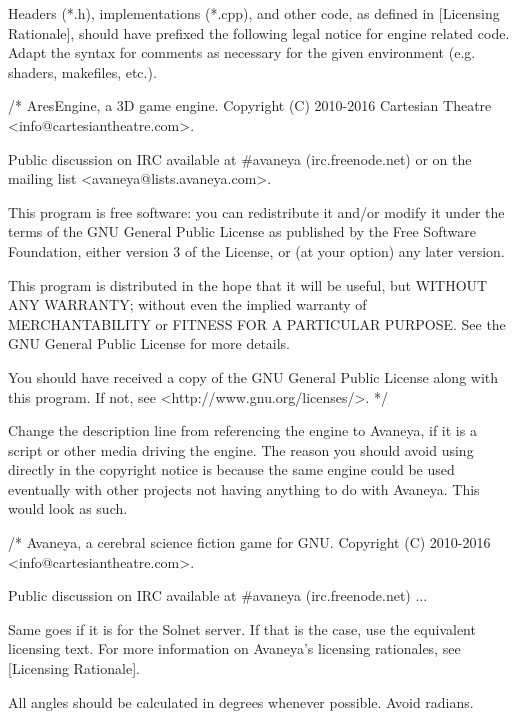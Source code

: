 Headers (*.h), implementations (*.cpp), and other code, as defined in [Licensing Rationale], should have prefixed the following legal notice for engine related code. Adapt the syntax for comments as necessary for the given environment (e.g. shaders, makefiles, etc.).

\startCodeExample
/*
    AresEngine, a 3D game engine.
    Copyright (C) 2010-2016 Cartesian Theatre <info@cartesiantheatre.com>.

    Public discussion on IRC available at #avaneya (irc.freenode.net)
    or on the mailing list <avaneya@lists.avaneya.com>.

    This program is free software: you can redistribute it and/or modify
    it under the terms of the GNU General Public License as published by
    the Free Software Foundation, either version 3 of the License, or
    (at your option) any later version.

    This program is distributed in the hope that it will be useful,
    but WITHOUT ANY WARRANTY; without even the implied warranty of
    MERCHANTABILITY or FITNESS FOR A PARTICULAR PURPOSE.  See the
    GNU General Public License for more details.

    You should have received a copy of the GNU General Public License
    along with this program.  If not, see <http://www.gnu.org/licenses/>.
*/
\stopCodeExample

Change the description line from referencing the engine to Avaneya, if it is a script or other media driving the engine. The reason you should avoid using  directly in the copyright notice is because the same engine could be used eventually with other projects not having anything to do with Avaneya. This would look as such.

\startCodeExample
/*
    Avaneya, a cerebral science fiction game for GNU.
    Copyright (C) 2010-2016 <info@cartesiantheatre.com>.

    Public discussion on IRC available at #avaneya (irc.freenode.net)
    ...
\stopCodeExample

Same goes if it is for the Solnet server. If that is the case, use the equivalent licensing text. For more information on Avaneya's licensing rationales, see [Licensing Rationale].


\startitemize[4]
\item
All angles should be calculated in degrees whenever possible. Avoid radians.

